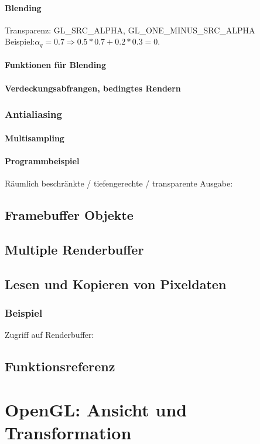 \subsubsection{Blending}
Transparenz: GL\_SRC\_ALPHA, GL\_ONE\_MINUS\_SRC\_ALPHA\\
Beispiel:$\alpha_q = 0.7 \Rightarrow 0.5*0.7+0.2*0.3 = 0.$
\subsubsection*{Funktionen für Blending}
\subsubsection{Verdeckungsabfrangen, bedingtes Rendern}
\subsection{Antialiasing}
\subsubsection{Multisampling}
\subsubsection*{Programmbeispiel}
Räumlich beschränkte / tiefengerechte / transparente Ausgabe:
\section{Framebuffer Objekte}
\section{Multiple Renderbuffer}
\section{Lesen und Kopieren von Pixeldaten}
\subsection*{Beispiel}
Zugriff auf Renderbuffer:

\section{Funktionsreferenz}

\chapter{OpenGL: Ansicht und Transformation}

